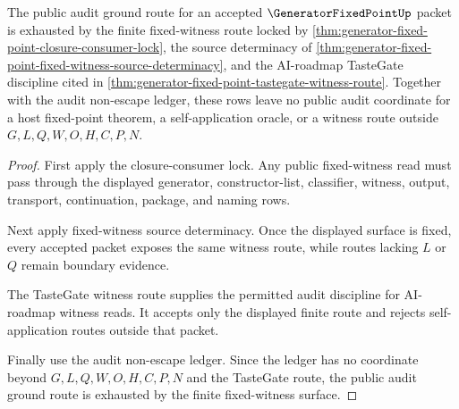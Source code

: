 \begin{theorem}
\label{thm:generator-fixed-point-audit-ground-route-exhaustion}
The public audit ground route for an accepted $\GeneratorFixedPointUp$ packet is exhausted by the finite fixed-witness route locked by \autoref{thm:generator-fixed-point-closure-consumer-lock}, the source determinacy of \autoref{thm:generator-fixed-point-fixed-witness-source-determinacy}, and the AI-roadmap TasteGate discipline cited in \autoref{thm:generator-fixed-point-tastegate-witness-route}. Together with the audit non-escape ledger, these rows leave no public audit coordinate for a host fixed-point theorem, a self-application oracle, or a witness route outside $G,L,Q,W,O,H,C,P,N$.
\end{theorem}
\begin{proof}
First apply the closure-consumer lock. Any public fixed-witness read must pass through the displayed generator, constructor-list, classifier, witness, output, transport, continuation, package, and naming rows.

Next apply fixed-witness source determinacy. Once the displayed surface is fixed, every accepted packet exposes the same witness route, while routes lacking $L$ or $Q$ remain boundary evidence.

The TasteGate witness route supplies the permitted audit discipline for AI-roadmap witness reads. It accepts only the displayed finite route and rejects self-application routes outside that packet.

Finally use the audit non-escape ledger. Since the ledger has no coordinate beyond $G,L,Q,W,O,H,C,P,N$ and the TasteGate route, the public audit ground route is exhausted by the finite fixed-witness surface.
\end{proof}

